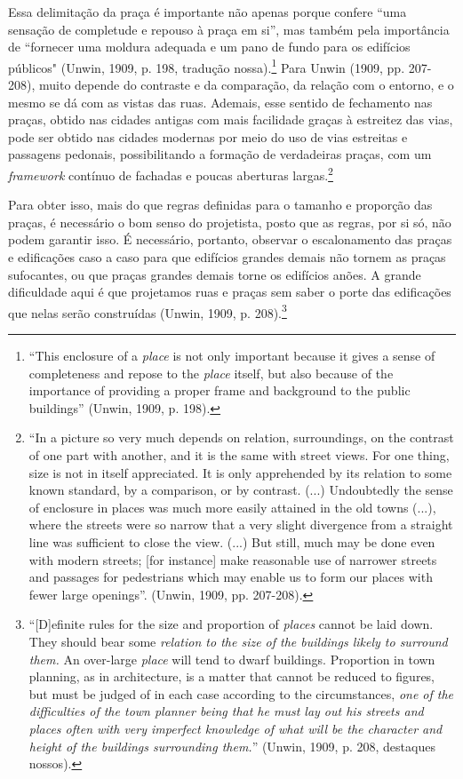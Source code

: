 \documentclass[12pt, a4paper]{book} %
\begin{document}
        Essa delimitação da praça é importante não apenas porque confere ``uma sensação de completude e repouso à praça em si'', mas também pela importância de ``fornecer uma moldura adequada e um pano de fundo para os edifícios públicos" (Unwin, 1909, p. 198, tradução nossa).\footnote[64]{``This enclosure of a \textit{place} is not only important because it gives a sense of completeness and repose to the \textit{place} itself, but also because of the importance of providing a proper frame and background to the public buildings'' (Unwin, 1909, p. 198).} Para Unwin (1909, pp. 207-208), muito depende do contraste e da comparação, da relação com o entorno, e o mesmo se dá com as vistas das ruas. Ademais, esse sentido de fechamento nas praças, obtido nas cidades antigas com mais facilidade graças à estreitez das vias, pode ser obtido nas cidades modernas por meio do uso de vias estreitas e passagens pedonais, possibilitando a formação de verdadeiras praças, com um \textit{framework} contínuo de fachadas e poucas aberturas largas.\footnote[65]{``In a picture so very much depends on relation, surroundings, on the contrast of one part with another, and it is the same with street views. For one thing, size is not in itself appreciated. It is only apprehended by its relation to some known standard, by a comparison, or by contrast. (...) Undoubtedly the sense of enclosure in places was much more easily attained in the old towns (...), where the streets were so narrow that a very slight divergence from a straight line was sufficient to close the view. (...) But still, much may be done even with modern streets; [for instance] make reasonable use of narrower streets and passages for pedestrians which may enable us to form our places with fewer large openings''. (Unwin, 1909, pp. 207-208).}

        Para obter isso, mais do que regras definidas para o tamanho e proporção das praças, é necessário o bom senso do projetista, posto que as regras, por si só, não podem garantir isso. É necessário, portanto, observar o escalonamento das praças e edificações caso a caso para que edifícios grandes demais não tornem as praças sufocantes, ou que praças grandes demais torne os edifícios anões. A grande dificuldade aqui é que projetamos ruas e praças sem saber o porte das edificações que nelas serão construídas (Unwin, 1909, p. 208).\footnote[66]{``[D]efinite rules for the size and proportion of \textit{places} cannot be laid down. They should bear some \textit{relation to the size of the buildings likely to surround them.} An over-large \textit{place} will tend to dwarf buildings. Proportion in town planning, as in architecture, is a matter that cannot be reduced to figures, but must be judged of in each case according to the circumstances, \textit{one of the difficulties of the town planner being that he must lay out his streets and places often with very imperfect knowledge of what will be the character and height of the buildings surrounding them.}'' (Unwin, 1909, p. 208, destaques nossos).}
\end{document}
